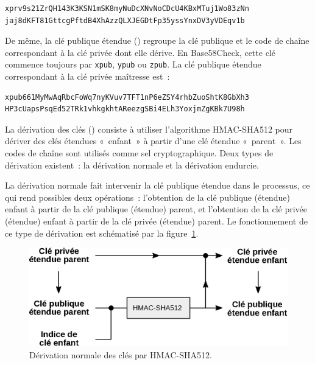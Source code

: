 \begin{Verbatim}[fontsize=\footnotesize]
xprv9s21ZrQH143K3KSN1mSK8myNuDcXNvNoCDcU4KBxMTuj1Wo83zNn
jaj8dKFT81GttcgPftdB4XhAzzQLXJEGDtFp35yssYnxDV3yVDEqv1b
\end{Verbatim}

De même, la clé publique étendue () regroupe la clé publique et le code de chaîne correspondant à la clé privée dont elle dérive. En Base58Check, cette clé commence toujours par \texttt{xpub}, \texttt{ypub} ou \texttt{zpub}. La clé publique étendue correspondant à la clé privée maîtresse est~:

\begin{Verbatim}[fontsize=\footnotesize]
xpub661MyMwAqRbcFoWq7nyKVuv7TFT1nP6eZSY4rhbZuoShtK8GbXh3
HP3cUapsPsqEd52TRk1vhkgkhtAReezgSBi4ELh3YoxjmZgKBk7U98h
\end{Verbatim}


La dérivation des clés () consiste à utiliser l'algorithme HMAC-SHA512 pour dériver des clés étendues «~enfant~» à partir d'une clé étendue «~parent~». Les codes de chaîne sont utilisés comme sel cryptographique. Deux types de dérivation existent~: la dérivation normale et la dérivation endurcie.

La dérivation normale fait intervenir la clé publique étendue dans le processus, ce qui rend possibles deux opérations~: l'obtention de la clé publique (étendue) enfant à partir de la clé publique (étendue) parent, et l'obtention de la clé privée (étendue) enfant à partir de la clé privée (étendue) parent. Le fonctionnement de ce type de dérivation est schématisé par la figure~\ref{fig:normal-child-key-derivation}.

\begin{figure}[h]
  \centering
  \includegraphics[scale=0.7]{img/normal-child-key-derivation.eps}
  \caption{Dérivation normale des clés par HMAC-SHA512.}
  \label{fig:normal-child-key-derivation}
\end{figure}

